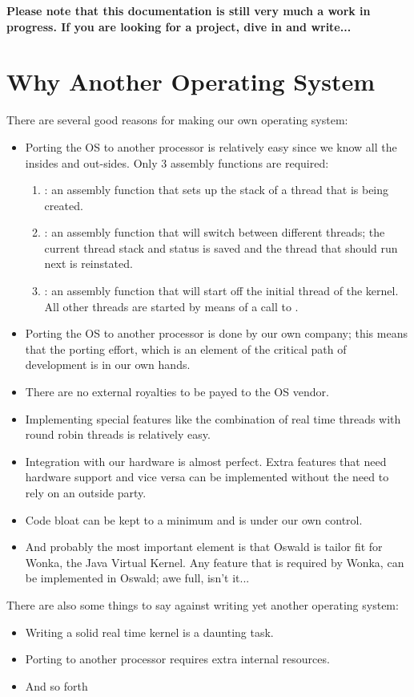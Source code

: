 
\textbf{Please note that this documentation is still very much a work in
progress. If you are looking for a project, dive in and write...}

\section{Why Another Operating System}

There are several good reasons for making our own operating system:

\begin{itemize}
\item Porting the OS to another processor is relatively easy since we know
all the insides and out-sides. Only 3 assembly functions are required:
\begin{enumerate}
\item {}: an assembly function that sets up the stack of
a thread that is being created.
\item {}: an assembly function that will switch
between different threads; the current thread stack and status is saved and the thread
that should run next is reinstated.
\item {}: an assembly function that will start off the
initial thread of the kernel. All other threads are started by means of a
call to .
\end{enumerate}

\item Porting the OS to another processor is done by our own company; this
means that the porting effort, which is an element of the critical path of
development is in our own hands.
\item There are no external royalties to be payed to the OS vendor.
\item Implementing special features like the combination of real time
threads with round robin threads is relatively easy.
\item Integration with our hardware is almost perfect. Extra features that
need hardware support and vice versa can be implemented without the need to
rely on an outside party.
\item Code bloat can be kept to a minimum and is under our own control.
\item And probably the most important element is that Oswald is tailor fit for
Wonka, the Java Virtual Kernel. Any feature that is required by Wonka, can
be implemented in Oswald; awe full, isn't it...
\end{itemize}

There are also some things to say against writing yet another operating
system:

\begin{itemize}
\item Writing a solid real time kernel is a daunting task.
\item Porting to another processor requires extra internal resources.
\item And so forth
\end{itemize}
